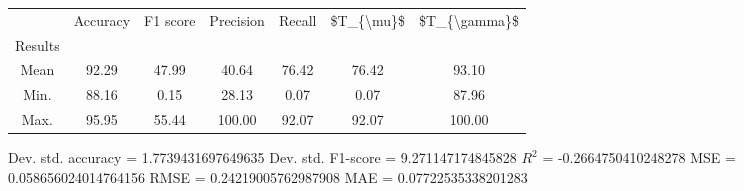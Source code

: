 \begin{tabular}{|c|c|c|c|c|c|c|}
\toprule
{} &  Accuracy &  F1 score &  Precision &  Recall &  \$T\_\{\textbackslash mu\}\$ &  \$T\_\{\textbackslash gamma\}\$ \\
Results &           &           &            &         &            &               \\
\hline
Mean    &     92.29 &     47.99 &      40.64 &   76.42 &      76.42 &         93.10 \\
Min.    &     88.16 &      0.15 &      28.13 &    0.07 &       0.07 &         87.96 \\
Max.    &     95.95 &     55.44 &     100.00 &   92.07 &      92.07 &        100.00 \\
\bottomrule
\end{tabular}

 Dev. std. accuracy = 1.7739431697649635
 Dev. std. F1-score = 9.271147174845828
 $R^2$ = -0.2664750410248278
 MSE = 0.058656024014764156
 RMSE = 0.24219005762987908
 MAE = 0.07722535338201283